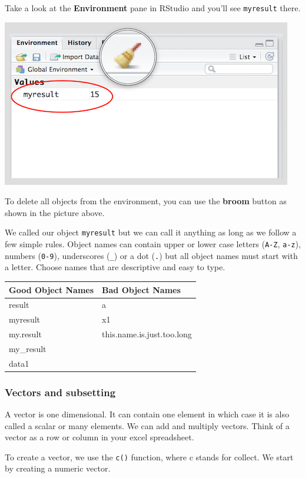 \documentclass[]{article}
\begin{document}
Take a look at the \textbf{Environment} pane in RStudio and you'll see \texttt{myresult} there.

\includegraphics{./img/rstudio_env.png}

To delete all objects from the environment, you can use the \textbf{broom} button as shown in the picture above.

We called our object \texttt{myresult} but we can call it anything as long as we follow a few simple rules. Object names can contain upper or lower case letters (\texttt{A-Z}, \texttt{a-z}), numbers (\texttt{0-9}), underscores (\texttt{\_}) or a dot (\texttt{.}) but all object names must start with a letter. Choose names that are descriptive and easy to type.

\begin{longtable}[]{@{}ll@{}}
\toprule
Good Object Names & Bad Object Names\tabularnewline
\midrule
\endhead
result & a\tabularnewline
myresult & x1\tabularnewline
my.result & this.name.is.just.too.long\tabularnewline
my\_result &\tabularnewline
data1 &\tabularnewline
\bottomrule
\end{longtable}

\hypertarget{vectors-and-subsetting}{%
\subsubsection{Vectors and subsetting}\label{vectors-and-subsetting}}

A vector is one dimensional. It can contain one element in which case it is also called a scalar or many elements. We can add and multiply vectors. Think of a vector as a row or column in your excel spreadsheet.

To create a vector, we use the \texttt{c()} function, where c stands for collect. We start by creating a numeric vector.
\end{document}
